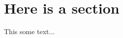 \documentclass{article}
\begin{document}
\section{Here is a section}
This some text...
\end{document}
